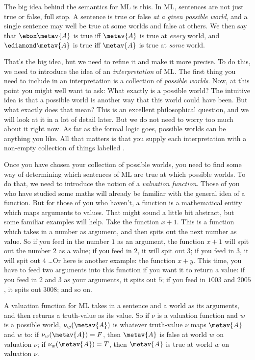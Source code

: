 The big idea behind the semantics for ML is this. In ML, sentences are not just true or false, full stop. A sentence is true or false \emph{at a given possible world}, and a single sentence may well be true at some worlds and false at others. We then say that $\ebox \metav{A}$ is true iff $\metav{A}$ is true at \emph{every} world, and $\ediamond\metav{A}$ is true iff $\metav{A}$ is true at \emph{some} world.

That's the big idea, but we need to refine it and make it more precise. To do this, we need to introduce the idea of an \emph{interpretation} of ML. The first thing you need to include in an interpretation is a collection of \emph{possible worlds}. Now, at this point you might well want to ask: What exactly is a possible world? The intuitive idea is that a possible world is another way that this world could have been. But what exactly does that mean? This is an excellent philosophical question, and we will look at it in a lot of detail later. But we do not need to worry too much about it right now. As far as the formal logic goes, possible worlds can be anything you like. All that matters is that you supply each interpretation with a non-empty collection of things labelled .

Once you have chosen your collection of possible worlds, you need to find some way of determining which sentences of ML are true at which possible worlds. To do that, we need to introduce the notion of a \emph{valuation function}. Those of you who have studied some maths will already be familiar with the general idea of a function. But for those of you who haven't, a function is a mathematical entity which maps arguments to values. That might sound a little bit abstract, but some familiar examples will help. Take the function $x+1$. This is a function which takes in a number as argument, and then spits out the next number as value. So if you feed in the number $1$ as an argument, the function $x+1$ will spit out the number $2$ as a value; if you feed in $2$, it will spit out $3$; if you feed in $3$, it will spit out $4$ \dots  Or here is another example: the function $x+y$. This time, you have to feed two arguments into this function if you want it to return a value: if you feed in $2$ and $3$ as your arguments, it spits out $5$; if you feed in $1003$ and $2005$, it spits out $3008$; and so on.

A valuation function for ML takes in a sentence and a world as its arguments, and then returns a truth-value as its value. So if $\nu$ is a valuation function and $w$ is a possible world, $\nu_w(\metav{A})$ is whatever truth-value $\nu$ maps $\metav{A}$ and $w$ to: if $\nu_w(\metav{A})=F$, then $\metav{A}$ is false at world $w$ on valuation $\nu$; if $\nu_w(\metav{A})=T$, then $\metav{A}$ is true at world $w$ on valuation $\nu$.

